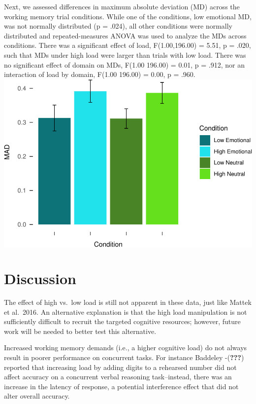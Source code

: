 \documentclass[man]{apa6}
\begin{document}
Next, we assessed differences in maximum absolute deviation (MD) across the working memory trial conditions. While one of the conditions, low emotional MD, was not normally distributed (p = .024), all other conditions were normally distributed and repeated-measures ANOVA was used to analyze the MDs across conditions. There was a significant effect of load, F(1.00,196.00) = 5.51, p = .020, such that MDs under high load were larger than trials with low load. There was no significant effect of domain on MDs, F(1.00 196.00) = 0.01, p = .912, nor an interaction of load by domain, F(1.00 196.00) = 0.00, p = .960.
\includegraphics{Manuscript_files/figure-latex/MAD plot-1.pdf}

\hypertarget{discussion}{%
\section{Discussion}\label{discussion}}

The effect of high vs.~low load is still not apparent in these data, just like Mattek et al.~2016. An alternative explanation is that the high load manipulation is not sufficiently difficult to recruit the targeted cognitive resources; however, future work will be needed to better test this alternative.

Increased working memory demands (i.e., a higher cognitive load) do not always result in poorer performance on concurrent tasks. For instance Baddeley -({\textbf{???}}) reported that increasing load by adding digits to a rehearsed number did not affect accuracy on a concurrent verbal reasoning task--instead, there was an increase in the latency of response, a potential interference effect that did not alter overall accuracy.
\end{document}
